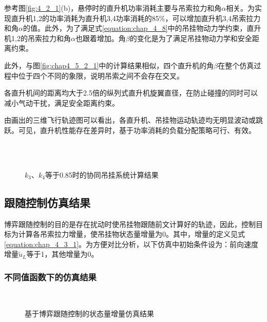 参考图\ref{fig:4_2_1}(b)，悬停时的直升机功率消耗主要与吊索拉力和角$\alpha$相关。为实现直升机1,2的功率消耗为直升机3,4功率消耗的85\%，可以增加直升机3,4吊索拉力和角$\alpha$的值。此外，为了满足式\ref{equation:chap_4_8}中的吊挂物动力学约束，直升机1,2的吊索拉力和角$\alpha$也跟着增加。角$\beta$的变化是为了满足吊挂物动力学和安全距离约束。

此外，与图\ref{fig:chap4_5_2_1}中的计算结果相似，四个直升机的角$\beta$在整个仿真过程中位于四个不同的象限，说明吊索之间不会存在交叉。

各直升机间的距离均大于2.5倍的纵列式直升机旋翼直径，在防止碰撞的同时可以减小气动干扰，满足安全距离约束。

由画出的三维飞行轨迹图可以看出，各直升机、吊挂物运动轨迹均无明显波动或跳跃。可见，直升机性能存在差异时，基于功率消耗的负载分配策略可行、有效。
\begin{figure}[!htb]
  \quad
  \\
  \quad
  \\
  \quad
  \caption{$k_3$、$k_4$等于0.85时的协同吊挂系统计算结果}
  \label{fig:chap4_5_2_3}
\end{figure}

\subsection{跟随控制仿真结果}
博弈跟随控制的目的是存在扰动时使吊挂物跟随前文计算好的轨迹，因此，控制目标为计算各吊索拉力增量，使吊挂物状态量增量为0。其中，增量的定义见式\ref{equation:chap_4_3_1}。为方便对比分析，以下仿真中初始条件设为：前向速度增量$\tilde{u}_L$等于1，其他增量为0。
\subsubsection{不同值函数下的仿真结果}
\begin{figure}[!htb]
  \quad
  \\
  \quad
  \caption{基于博弈跟随控制的状态量增量仿真结果}
  \label{fig:chap4_5_3_1_1}
\end{figure}

